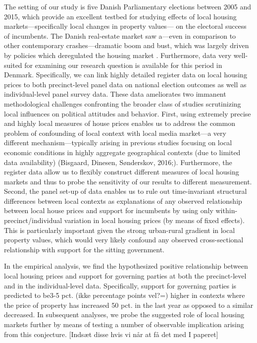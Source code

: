 \documentclass[12pt,a4paper]{article}
\begin{document}
The setting of our study is five Danish Parliamentary elections between 2005 and 2015, which provide an excellent testbed for studying effects of local housing markets—specifically local changes in property values— on the electoral success of incumbents. The Danish real-estate market saw a—even in comparison to other contemporary crashes—dramatic boom and bust, which was largely driven by policies which deregulated the housing market \citep{dam2011housing}. Furthermore, data very well-suited for examining our research question is available for this period in Denmark. Specifically, we can link highly detailed register data on local housing prices to both precinct-level panel data on national election outcomes as well as individual-level panel survey data. These data ameliorates two immanent methodological challenges confronting the broader class of studies scrutinizing local influences on political attitudes and behavior. First, using extremely precise and highly local measures of house prices enables us to address the common problem of confounding of local context with local media market—a very different mechanism—typically arising in previous studies focusing on local economic conditions in highly aggregate geographical contexts (due to limited data availability) (Bisgaard, Dinesen, Sønderskov, 2016;). Furthermore, the register data allow us to flexibly construct different measures of local housing markets and thus to probe the sensitivity of our results to different measurement. Second, the panel set-up of data enables us to rule out time-invariant structural differences between local contexts as explanations of any observed relationship between local house prices and support for incumbents by using only within-precinct/individual variation in local housing prices (by means of fixed effects). This is particularly important given the strong urban-rural gradient in local property values, which would very likely confound any observed cross-sectional relationship with support for the sitting government. 

In the empirical analysis, we find the hypothesized positive relationship between local housing prices and support for governing parties at both the precinct-level and in the individual-level data. Specifically, support for governing parties is predicted to be3-5 pct. (ikke percentage points vel?=) higher in contexts where the price of property has increased 50 pct. in the last year as opposed to a similar decreased. In subsequent analyses, we probe the suggested role of local housing markets further by means of testing a number of observable implication arising from this conjecture. [Indsæt disse hvis vi når at få det med I paperet]
\end{document}
